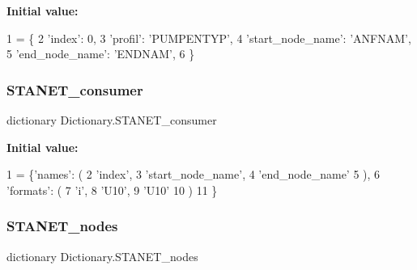 {\bfseries Initial value\+:}
\begin{DoxyCode}
1 =  \{
2                                 \textcolor{stringliteral}{'index'}: 0,
3                                 \textcolor{stringliteral}{'profil'}: \textcolor{stringliteral}{'PUMPENTYP'},
4                                 \textcolor{stringliteral}{'start\_node\_name'}: \textcolor{stringliteral}{'ANFNAM'},
5                                 \textcolor{stringliteral}{'end\_node\_name'}: \textcolor{stringliteral}{'ENDNAM'},
6                                 \}
\end{DoxyCode}
\mbox{\label{namespace_dictionary_a4d548616b60c21d9481e34dc5f56ff6d}} 
\subsubsection{\texorpdfstring{S\+T\+A\+N\+E\+T\+\_\+consumer}{STANET\_consumer}}
{\footnotesize\ttfamily dictionary Dictionary.\+S\+T\+A\+N\+E\+T\+\_\+consumer}

{\bfseries Initial value\+:}
\begin{DoxyCode}
1 =        \{\textcolor{stringliteral}{'names'}: (
2                                 \textcolor{stringliteral}{'index'},
3                                 \textcolor{stringliteral}{'start\_node\_name'},
4                                 \textcolor{stringliteral}{'end\_node\_name'}
5                                 ),
6                        \textcolor{stringliteral}{'formats'}: (
7                                 \textcolor{stringliteral}{'i'},
8                                 \textcolor{stringliteral}{'U10'},
9                                 \textcolor{stringliteral}{'U10'}
10                                 )
11                                \}
\end{DoxyCode}
\mbox{\label{namespace_dictionary_a716974bfb5b5b6f527f42b336c7d8a78}} 
\subsubsection{\texorpdfstring{S\+T\+A\+N\+E\+T\+\_\+nodes}{STANET\_nodes}}
{\footnotesize\ttfamily dictionary Dictionary.\+S\+T\+A\+N\+E\+T\+\_\+nodes}

